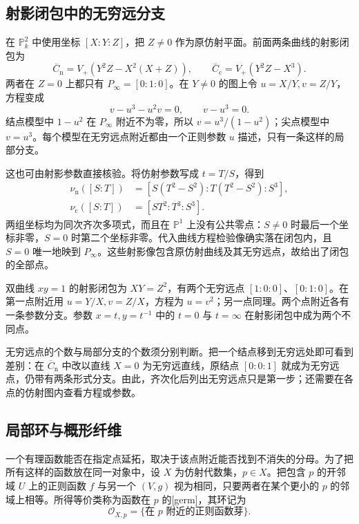 \subsection{射影闭包中的无穷远分支}
\label{g5:subsec:0105:02}

在 \(\mathbb P_k^2\) 中使用坐标 \([X:Y:Z]\)，把 \(Z\ne0\) 作为原仿射平面。前面两条曲线的射影闭包为
\[
	\overline C_{\mathrm n}=V_+(Y^2Z-X^2(X+Z)),\qquad
	\overline C_{\mathrm c}=V_+(Y^2Z-X^3).
\]
两者在 \(Z=0\) 上都只有 \(P_\infty=[0:1:0]\)。在 \(Y\ne0\) 的图上令 \(u=X/Y,v=Z/Y\)，方程变成
\[
	v-u^3-u^2v=0,\qquad v-u^3=0.
\]
结点模型中 \(1-u^2\) 在 \(P_\infty\) 附近不为零，所以 \(v=u^3/(1-u^2)\)；尖点模型中 \(v=u^3\)。每个模型在无穷远点附近都由一个正则参数 \(u\) 描述，只有一条这样的局部分支。

\ProseParagraphBreak

这也可由射影参数直接核验。将仿射参数写成 \(t=T/S\)，得到
\[
\begin{aligned}
	\nu_{\mathrm n}([S:T])
		&=[S(T^2-S^2):T(T^2-S^2):S^3],\\
	\nu_{\mathrm c}([S:T])
		&=[ST^2:T^3:S^3].
\end{aligned}
\]
两组坐标均为同次齐次多项式，而且在 \(\mathbb P^1\) 上没有公共零点：\(S\ne0\) 时最后一个坐标非零，\(S=0\) 时第二个坐标非零。代入曲线方程检验像确实落在闭包内，且 \(S=0\) 唯一地映到 \(P_\infty\)。这些射影像包含原仿射曲线及其无穷远点，故给出了闭包的全部点。

\begin{example}\label{g5:exm:two-infinity-branches}
	双曲线 \(xy=1\) 的射影闭包为 \(XY=Z^2\)，有两个无穷远点 \([1:0:0]\)、\([0:1:0]\)。在第一点附近用 \(u=Y/X,v=Z/X\)，方程为 \(u=v^2\)；另一点同理。两个点附近各有一条参数分支。参数 \(x=t,y=t^{-1}\) 中的 \(t=0\) 与 \(t=\infty\) 在射影闭包中成为两个不同点。
\end{example}

无穷远点的个数与局部分支的个数须分别判断。把一个结点移到无穷远处即可看到差别：在 \(\overline C_{\mathrm n}\) 中改以直线 \(X=0\) 为无穷远直线，原结点 \([0:0:1]\) 就成为无穷远点，仍带有两条形式分支。由此，齐次化后列出无穷远点只是第一步；还需要在各点的仿射图内查看方程或参数。

\subsection{局部环与概形纤维}
\label{g5:subsec:0105:03}

一个有理函数能否在指定点延拓，取决于该点附近能否找到不消失的分母。为了把所有这样的函数放在同一对象中，设 \(X\) 为仿射代数集，\(p\in X\)。把包含 \(p\) 的开邻域 \(U\) 上的正则函数 \(f\) 与另一个 \((V,g)\) 视为相同，只要两者在某个更小的 \(p\) 的邻域上相等。所得等价类称为函数在 \(p\) 的[germ]，其环记为
\[
	\mathcal O_{X,p}=\{\text{在 }p\text{ 附近的正则函数芽}\}.
\]

